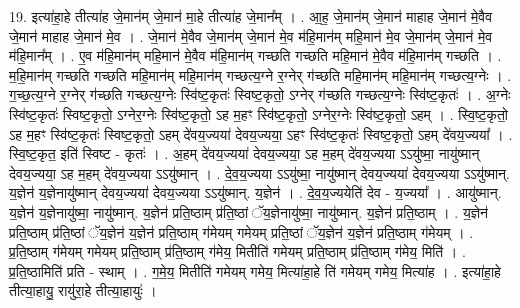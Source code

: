 \documentclass[17pt]{extarticle}
\begin{document}
19. इत्या॑हा॒हे तीत्या॑ह जे॒मान॑म् जे॒मान॑ मा॒हे तीत्या॑ह जे॒मान᳚म् । . आ॒ह॒ जे॒मान॑म् जे॒मान॑ माहाह जे॒मान॑ मे॒वैव जे॒मान॑ माहाह जे॒मान॑ मे॒व । . जे॒मान॑ मे॒वैव जे॒मान॑म् जे॒मान॑ मे॒व म॑हि॒मान॑म् महि॒मान॑ मे॒व जे॒मान॑म् जे॒मान॑ मे॒व म॑हि॒मान᳚म् । . ए॒व म॑हि॒मान॑म् महि॒मान॑ मे॒वैव म॑हि॒मान॑म् गच्छति गच्छति महि॒मान॑ मे॒वैव म॑हि॒मान॑म् गच्छति । . म॒हि॒मान॑म् गच्छति गच्छति महि॒मान॑म् महि॒मान॑म् गच्छत्य॒ग्ने र॒ग्नेर् ग॑च्छति महि॒मान॑म् महि॒मान॑म् गच्छत्य॒ग्नेः । . ग॒च्छ॒त्य॒ग्ने र॒ग्नेर् ग॑च्छति गच्छत्य॒ग्नेः स्वि॑ष्ट॒कृतः॑ स्विष्ट॒कृतो॒ ऽग्नेर् ग॑च्छति गच्छत्य॒ग्नेः स्वि॑ष्ट॒कृतः॑ । . अ॒ग्नेः स्वि॑ष्ट॒कृतः॑ स्विष्ट॒कृतो॒ ऽग्नेर॒ग्नेः स्वि॑ष्ट॒कृतो॒ ऽह म॒हꣳ स्वि॑ष्ट॒कृतो॒ ऽग्नेर॒ग्नेः स्वि॑ष्ट॒कृतो॒ ऽहम् । . स्वि॒ष्ट॒कृतो॒ ऽह म॒हꣳ स्वि॑ष्ट॒कृतः॑ स्विष्ट॒कृतो॒ ऽहम् दे॑वय॒ज्यया॑ देवय॒ज्यया॒ ऽहꣳ स्वि॑ष्ट॒कृतः॑ स्विष्ट॒कृतो॒ ऽहम् दे॑वय॒ज्यया᳚ । . स्वि॒ष्ट॒कृत॒ इति॑ स्विष्ट - कृतः॑ । . अ॒हम् दे॑वय॒ज्यया॑ देवय॒ज्यया॒ ऽह म॒हम् दे॑वय॒ज्यया ऽऽयु॑ष्मा॒ नायु॑ष्मान् देवय॒ज्यया॒ ऽह म॒हम् दे॑वय॒ज्यया ऽऽयु॑ष्मान् । . दे॒व॒य॒ज्यया ऽऽयु॑ष्मा॒ नायु॑ष्मान् देवय॒ज्यया॑ देवय॒ज्यया ऽऽयु॑ष्मान्. य॒ज्ञेन॑ य॒ज्ञेनायु॑ष्मान् देवय॒ज्यया॑ देवय॒ज्यया ऽऽयु॑ष्मान्. य॒ज्ञेन॑ । . दे॒व॒य॒ज्ययेति॑ देव - य॒ज्यया᳚ । . आयु॑ष्मान्. य॒ज्ञेन॑ य॒ज्ञेनायु॑ष्मा॒ नायु॑ष्मान्. य॒ज्ञेन॑ प्रति॒ष्ठाम् प्र॑ति॒ष्ठां ॅय॒ज्ञेनायु॑ष्मा॒ नायु॑ष्मान्. य॒ज्ञेन॑ प्रति॒ष्ठाम् । . य॒ज्ञेन॑ प्रति॒ष्ठाम् प्र॑ति॒ष्ठां ॅय॒ज्ञेन॑ य॒ज्ञेन॑ प्रति॒ष्ठाम् ग॑मेयम् गमेयम् प्रति॒ष्ठां ॅय॒ज्ञेन॑ य॒ज्ञेन॑ प्रति॒ष्ठाम् ग॑मेयम् । . प्र॒ति॒ष्ठाम् ग॑मेयम् गमेयम् प्रति॒ष्ठाम् प्र॑ति॒ष्ठाम् ग॑मेय॒ मितीति॑ गमेयम् प्रति॒ष्ठाम् प्र॑ति॒ष्ठाम् ग॑मेय॒ मिति॑ । . प्र॒ति॒ष्ठामिति॑ प्रति - स्थाम् । . ग॒मे॒य॒ मितीति॑ गमेयम् गमेय॒ मित्या॑हा॒हे ति॑ गमेयम् गमेय॒ मित्या॑ह । . इत्या॑हा॒हे तीत्या॒हायु॒ रायु॑रा॒हे तीत्या॒हायुः॑ । \newline
\end{document}
